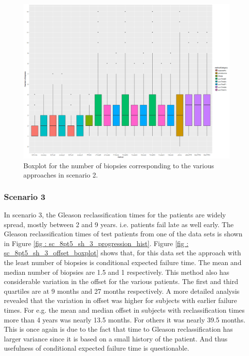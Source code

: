 \begin{figure}[H]
\centering
\captionsetup{justification=centering}
\includegraphics[width=\textwidth]{sim_study_res_sc_6_sh_1pt5/nb_boxplot.png}
\caption{\label{fig : sc_6_sh_1pt5_nb_boxplot} Boxplot for the number of biopsies corresponding to the various approaches in scenario 2.}
\end{figure}

\subsubsection{Scenario 3}
In scenario 3, the Gleason reclassification times for the patients are widely spread, mostly between 2 and 9 years. i.e. patients fail late as well early. The Gleason reclassification times of test patients from one of the data sets is shown in Figure \ref{fig : sc_8pt5_sh_3_progression_hist}. Figure \ref{fig : sc_8pt5_sh_3_offset_boxplot} shows that, for this data set the approach with the least number of biopsies is conditional expected failure time. The mean and median number of biopsies are 1.5 and 1 respectively. This method also has considerable variation in the offset for the various patients. The first and third quartiles are at 9 months and 27 months respectively. A more detailed analysis revealed that the variation in offset was higher for subjects with earlier failure times. For e.g. the mean and median offset in subjects with reclassification times more than 4 years was nearly 13.5 months. For others it was nearly 39.5 months. This is once again is due to the fact that time to Gleason reclassification has larger variance since it is based on a small history of the patient. And thus usefulness of conditional expected failure time is questionable.\\

